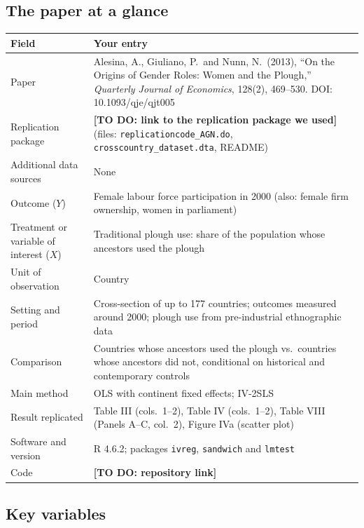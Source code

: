 \documentclass[11pt,a4paper]{article}
\renewcommand{\arraystretch}{1.25}
\begin{document}
\subsection{The paper at a glance}

{\renewcommand{\arraystretch}{1.4}%
\begin{tabularx}{\textwidth}{@{}>{\raggedright\arraybackslash}p{}L@{}}
\toprule
Field & Your entry \\
\midrule
Paper & Alesina, A., Giuliano, P.\ and Nunn, N.\ (2013), ``On the Origins of Gender Roles: Women and the Plough,'' \textit{Quarterly Journal of Economics}, 128(2), 469--530. DOI: 10.1093/qje/qjt005 \\
Replication package & \textbf{[TO DO: link to the replication package we used]} (files: \texttt{replicationcode\_AGN.do}, \texttt{crosscountry\_dataset.dta}, README) \\
Additional data sources & None \\
Outcome ($Y$) & Female labour force participation in 2000 (also: female firm ownership, women in parliament) \\
Treatment or variable of interest ($X$) & Traditional plough use: share of the population whose ancestors used the plough \\
Unit of observation & Country \\
Setting and period & Cross-section of up to 177 countries; outcomes measured around 2000; plough use from pre-industrial ethnographic data \\
Comparison & Countries whose ancestors used the plough vs.\ countries whose ancestors did not, conditional on historical and contemporary controls \\
Main method & OLS with continent fixed effects; IV-2SLS \\
Result replicated & Table III (cols.\ 1--2), Table IV (cols.\ 1--2), Table VIII (Panels A--C, col.\ 2), Figure IVa (scatter plot) \\
Software and version & R 4.6.2; packages \texttt{ivreg}, \texttt{sandwich} and \texttt{lmtest} \\
Code & \textbf{[TO DO: repository link]} \\
\bottomrule
\end{tabularx}}

\subsection{Key variables}
\end{document}
